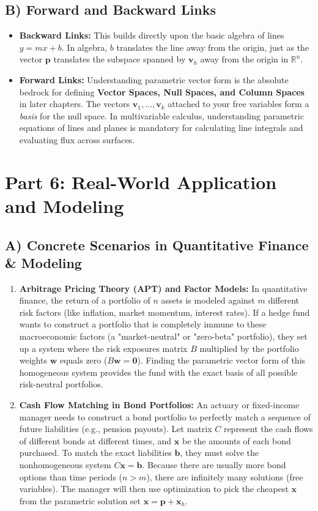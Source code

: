 \documentclass[11pt]{article}
\begin{document}
\subsection{B) Forward and Backward Links}
\begin{itemize}
    \item \textbf{Backward Links:} This builds directly upon the basic algebra of lines $y = mx + b$. In algebra, $b$ translates the line away from the origin, just as the vector $\mathbf{p}$ translates the subspace spanned by $\mathbf{v}_h$ away from the origin in $\mathbb{R}^n$.
    \item \textbf{Forward Links:} Understanding parametric vector form is the absolute bedrock for defining \textbf{Vector Spaces, Null Spaces, and Column Spaces} in later chapters. The vectors $\mathbf{v}_1, \dots, \mathbf{v}_k$ attached to your free variables form a \textit{basis} for the null space. In multivariable calculus, understanding parametric equations of lines and planes is mandatory for calculating line integrals and evaluating flux across surfaces. 
\end{itemize}

\newpage
\section{Part 6: Real-World Application and Modeling}

\subsection{A) Concrete Scenarios in Quantitative Finance \& Modeling}
\begin{enumerate}
    \item \textbf{Arbitrage Pricing Theory (APT) and Factor Models:} In quantitative finance, the return of a portfolio of $n$ assets is modeled against $m$ different risk factors (like inflation, market momentum, interest rates). If a hedge fund wants to construct a portfolio that is completely immune to these macroeconomic factors (a "market-neutral" or "zero-beta" portfolio), they set up a system where the risk exposures matrix $B$ multiplied by the portfolio weights $\mathbf{w}$ equals zero ($B\mathbf{w} = \mathbf{0}$). Finding the parametric vector form of this homogeneous system provides the fund with the exact basis of all possible risk-neutral portfolios.
    \item \textbf{Cash Flow Matching in Bond Portfolios:} An actuary or fixed-income manager needs to construct a bond portfolio to perfectly match a sequence of future liabilities (e.g., pension payouts). Let matrix $C$ represent the cash flows of different bonds at different times, and $\mathbf{x}$ be the amounts of each bond purchased. To match the exact liabilities $\mathbf{b}$, they must solve the nonhomogeneous system $C\mathbf{x} = \mathbf{b}$. Because there are usually more bond options than time periods ($n > m$), there are infinitely many solutions (free variables). The manager will then use optimization to pick the cheapest $\mathbf{x}$ from the parametric solution set $\mathbf{x} = \mathbf{p} + \mathbf{x}_h$.
\end{enumerate}
\end{document}
